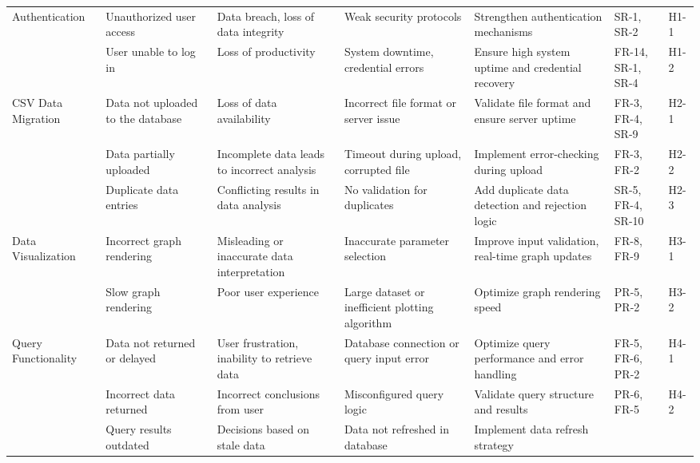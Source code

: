 \documentclass{article}
\begin{document}
\begin{landscape}
\begin{longtable}{|p{2.5cm}|p{4cm}|p{4cm}|p{4cm}|p{4cm}|p{1.25cm}|p{1cm}|}
        \hline
        \endfoot
        Authentication & Unauthorized user access & Data breach, loss of data
        integrity & Weak security protocols & Strengthen authentication
        mechanisms & SR-1, SR-2 & H1-1 \\
        \cline{2-7}
        \texttt{} & User unable to log in & Loss of productivity & System
        downtime, credential errors & Ensure high system uptime and credential
        recovery & FR-14, SR-1, SR-4 & H1-2 \\
        \cline{1-7}
        CSV Data Migration & Data not uploaded to the database & Loss of data
        availability & Incorrect file format or server issue & Validate file
        format and ensure server uptime & FR-3, FR-4, SR-9 & H2-1 \\
        \cline{2-7}
        \texttt{} & Data partially uploaded & Incomplete data leads to incorrect
        analysis & Timeout during upload, corrupted file & Implement
        error-checking during upload & FR-3, FR-2 & H2-2 \\
        \cline{2-7}
        \texttt{} & Duplicate data entries & Conflicting results in data
        analysis & No validation for duplicates & Add duplicate data detection
        and rejection logic & SR-5, FR-4, SR-10 & H2-3 \\
        \cline{1-7}
        Data Visualization & Incorrect graph rendering & Misleading or
        inaccurate data interpretation & Inaccurate parameter selection &
        Improve input validation, real-time graph updates & FR-8, FR-9 & H3-1 \\
        \cline{2-7}
        \texttt{} & Slow graph rendering & Poor user experience & Large dataset
        or inefficient plotting algorithm & Optimize graph rendering speed &
        PR-5, PR-2 & H3-2 \\
        \cline{1-7}
        Query Functionality & Data not returned or delayed & User frustration,
        inability to retrieve data & Database connection or query input error &
        Optimize query performance and error handling & FR-5, FR-6, PR-2 & H4-1
        \\
        \cline{2-7}
        \texttt{} & Incorrect data returned & Incorrect conclusions from user &
        Misconfigured query logic & Validate query structure and results & PR-6,
        FR-5 & H4-2 \\
        \cline{2-7}
        \texttt{} & Query results outdated & Decisions based on stale data &
        Data not refreshed in database & Implement data refresh strategy &

\end{longtable}
\end{landscape}
\end{document}
